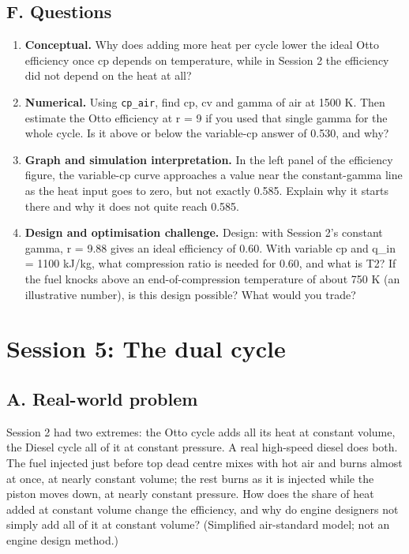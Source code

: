 \documentclass[11pt,a4paper]{article}
\begin{document}
\subsection*{F. Questions}
\begin{enumerate}[nosep]
\item \textbf{Conceptual.} Why does adding more heat per cycle lower the ideal Otto efficiency once cp depends on temperature, while in Session 2 the efficiency did not depend on the heat at all?
\item \textbf{Numerical.} Using \texttt{cp\_air}, find cp, cv and gamma of air at 1500 K. Then estimate the Otto efficiency at r = 9 if you used that single gamma for the whole cycle. Is it above or below the variable-cp answer of 0.530, and why?
\item \textbf{Graph and simulation interpretation.} In the left panel of the efficiency figure, the variable-cp curve approaches a value near the constant-gamma line as the heat input goes to zero, but not exactly 0.585. Explain why it starts there and why it does not quite reach 0.585.
\item \textbf{Design and optimisation challenge.} Design: with Session 2's constant gamma, r = 9.88 gives an ideal efficiency of 0.60. With variable cp and q\_in = 1100 kJ/kg, what compression ratio is needed for 0.60, and what is T2? If the fuel knocks above an end-of-compression temperature of about 750 K (an illustrative number), is this design possible? What would you trade?
\end{enumerate}
\section{Session 5: The dual cycle}

\subsection*{A. Real-world problem}
Session 2 had two extremes: the Otto cycle adds all its heat at constant volume, the Diesel cycle all of it at constant pressure. A real high-speed diesel does both. The fuel injected just before top dead centre mixes with hot air and burns almost at once, at nearly constant volume; the rest burns as it is injected while the piston moves down, at nearly constant pressure. How does the share of heat added at constant volume change the efficiency, and why do engine designers not simply add all of it at constant volume? (Simplified air-standard model; not an engine design method.)
\end{document}
